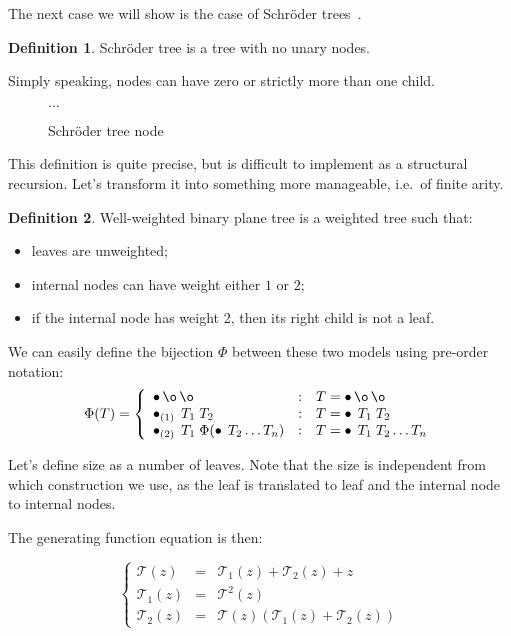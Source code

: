 \documentclass[final]{article}
\theoremstyle{definition}
\newtheorem{definition}{Definition}[subsection]
\theoremstyle{remark}
\newcommand{\gf}[1]{\ensuremath{\mathcal{#1}}}
\newcommand{\weighted}[1]{\ensuremath{_{(#1)}}}
\DeclareMathOperator{\n}{\bullet}
\DeclareMathOperator{\no}{\o}
\begin{document}
The next case we will show is the case of Schröder trees~\cite{schroder}.

\begin{definition}
    Schröder tree is a tree with no unary nodes.
\end{definition}

Simply speaking, nodes can have zero or strictly more than one child.

\begin{figure}[H]
    \centering
    
    
    
    
    \(\ldots\)
    \caption{Schröder tree node}
    \label{fig:schroder_trees}
\end{figure}

This definition is quite precise, but is difficult to implement as a structural recursion. Let's transform it into something more manageable, i.e.~of finite arity.

\begin{definition}
    Well-weighted binary plane tree is a weighted tree such that:
    \begin{itemize}
        \item leaves are unweighted;
        \item internal nodes can have weight either \(1\) or \(2\);
        \item if the internal node has weight 2, then its right child is not a leaf.
    \end{itemize}
\end{definition}

We can easily define the bijection \(\Phi\) between these two models using pre-order notation:
\[\Phi(T) = \left\{\begin{array}{lcl}
            \n \no \no &:& T = \n \no \no \\
            \n\weighted{1}\; T_1\; T_2 &:& T = \n\; T_1\; T_2\\
            \n\weighted{2}\; T_1\; \Phi(\n\; T_2 \ldots T_n) &:& T = \n\; T_1\; T_2 \ldots T_n
\end{array}\right.\]

Let's define size as a number of leaves. Note that the size is independent from which construction we use, as the leaf is translated to leaf and the internal node to internal nodes.

The generating function equation is then:

\[\left\{\begin{array}{rcl}
            \gf{T}(z) &=& \gf{T}_1(z) + \gf{T}_2(z) + z\\
            \gf{T}_1(z) &=& \gf{T}^2(z)\\
            \gf{T}_2(z) &=& \gf{T}(z)(\gf{T}_1(z) + \gf{T}_2(z))
\end{array}\right.\]
\end{document}
